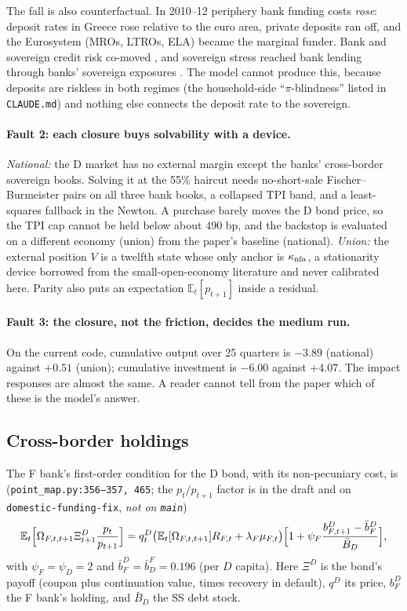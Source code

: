 \documentclass[11pt]{article}
\newcommand{\E}{\mathbb{E}}
\newcommand{\code}[1]{\texttt{\small #1}}
\begin{document}
The fall is also counterfactual. In 2010--12 periphery bank funding costs \emph{rose}: deposit
rates in Greece rose relative to the euro area, private deposits ran off, and the Eurosystem
(MROs, LTROs, ELA) became the marginal funder. Bank and sovereign credit risk co-moved
\citep{acharya2014pyrrhic}, and sovereign stress reached bank lending through banks' sovereign exposures
\citep{altavilla2017bank}. The model cannot produce this, because deposits are riskless in both
regimes (the household-side ``$\pi$-blindness'' listed in \code{CLAUDE.md}) and nothing else
connects the deposit rate to the sovereign.

\paragraph{Fault 2: each closure buys solvability with a device.}
\emph{National:} the D market has no external margin except the banks' cross-border sovereign
books. Solving it at the 55\% haircut needs no-short-sale Fischer--Burmeister pairs on all three
bank books, a collapsed TPI band, and a least-squares fallback in the Newton. A purchase barely
moves the D bond price, so the TPI cap cannot be held below about 490 bp, and the backstop is
evaluated on a different economy (union) from the paper's baseline (national).
\emph{Union:} the external position $V$ is a twelfth state whose only anchor is $\kappa_{\rm nfa}$,
a stationarity device borrowed from the small-open-economy literature and never calibrated here.
Parity also puts an expectation $\E_t[p_{t+1}]$ inside a residual.

\paragraph{Fault 3: the closure, not the friction, decides the medium run.}
On the current code, cumulative output over 25 quarters is $-3.89$ (national) against $+0.51$
(union); cumulative investment is $-6.00$ against $+4.07$. The impact responses are almost the
same. A reader cannot tell from the paper which of these is the model's answer.

\subsection{Cross-border holdings}

The F bank's first-order condition for the D bond, with its non-pecuniary cost, is
(\code{point\_map.py:356--357, 465}; the $p_t/p_{t+1}$ factor is in the draft and on
\code{domestic-funding-fix}, \emph{not on \code{main}})
\begin{equation}
\E_t\Bigl[\Omega_{F,t,t+1}\Xi^D_{t+1}\frac{p_t}{p_{t+1}}\Bigr]
=q^D_t\bigl(\E_t[\Omega_{F,t,t+1}]R_{F,t}+\lambda_F\mu_{F,t}\bigr)
\Bigl[1+\psi_F\frac{b^D_{F,t+1}-\bar b^D_F}{\bar B_D}\Bigr],
\label{eq:psi}
\end{equation}
with $\psi_F=\psi_D=2$ and $\bar b^D_F=\bar b^F_D=0.196$ (per $D$ capita). Here $\Xi^D$ is the
bond's payoff (coupon plus continuation value, times recovery in default), $q^D$ its price,
$b^D_F$ the F bank's holding, and $\bar B_D$ the SS debt stock.
\end{document}
